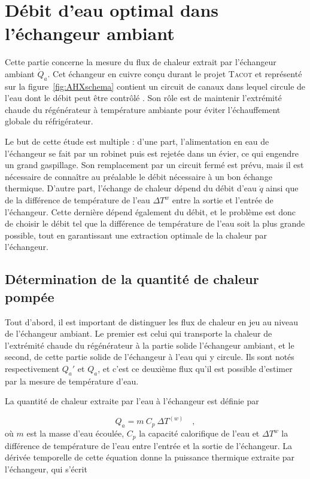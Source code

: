 \chapter{Débit d'eau optimal dans l'échangeur ambiant}\label{chap:AHX}
Cette partie concerne la mesure du flux de chaleur extrait par l'échangeur ambiant $\dot Q_a$. Cet échangeur en cuivre conçu durant le projet \textsc{Tacot} et représenté sur la figure~\ref{fig:AHXschema} contient un circuit de canaux dans lequel circule de l'eau dont le débit peut être contrôlé \cite{ANR_thermo-acoustic_2019, ramadan_design_2021}. Son rôle est de maintenir l'extrémité chaude du régénérateur à température ambiante pour éviter l'échauffement globale du réfrigérateur. 

Le but de cette étude est multiple : d'une part, l'alimentation en eau de l'échangeur se fait par un robinet puis est rejetée dans un évier, ce qui engendre un grand gaspillage. Son remplacement par un circuit fermé est prévu, mais il est nécessaire de connaître au préalable le débit nécessaire à un bon échange thermique. D'autre part, l'échange de chaleur dépend du débit d'eau $\dot q$ ainsi que de la différence de température de l'eau $\Delta T^w$ entre la sortie et l'entrée de l'échangeur. Cette dernière dépend également du débit, et le problème est donc de choisir le débit tel que la différence de température de l'eau soit la plus grande possible, tout en garantissant une extraction optimale de la chaleur par l'échangeur.

\section{Détermination de la quantité de chaleur pompée}
Tout d'abord, il est important de distinguer les flux de chaleur en jeu au niveau de l'échangeur ambiant. Le premier est celui qui transporte la chaleur de l'extrémité chaude du régénérateur à la partie solide l'échangeur ambiant, et le second, de cette partie solide de l'échangeur à l'eau qui y circule. Ils sont notés respectivement $Q_a'$ et $Q_a$, et c'est ce deuxième flux qu'il est possible d'estimer par la mesure de température d'eau.\smallskip

La quantité de chaleur extraite par l'eau à l'échangeur est définie par

\begin{equation}
    Q_a = m\ C_p\ \Delta T^{(w)}\quad,
    \label{eq:Qa_energie}
\end{equation}
où $m$ est la masse d'eau écoulée, $C_p$ la capacité calorifique de l'eau et $\Delta T^w$ la différence de température de l'eau entre l'entrée et la sortie de l'échangeur. La dérivée temporelle de cette équation donne la puissance thermique extraite par l'échangeur, qui s'écrit

